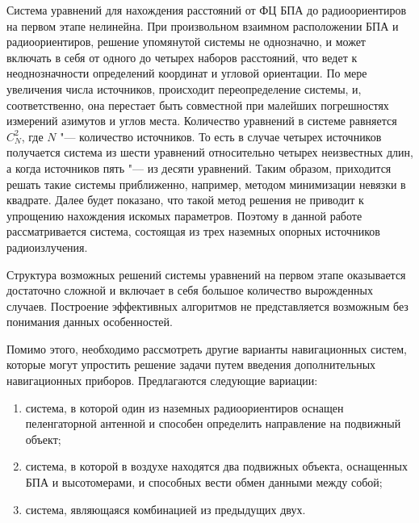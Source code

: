 \documentclass[../main.tex]{subfiles}
\begin{document}
Система уравнений для нахождения расстояний от ФЦ БПА до радиоориентиров на первом этапе нелинейна. При произвольном взаимном расположении БПА и радиоориентиров, решение упомянутой системы не однозначно, и может включать в себя от одного до четырех наборов расстояний, что ведет к неоднозначности определений координат и угловой ориентации. По мере увеличения числа источников, происходит переопределение системы, и, соответственно, она перестает быть совместной при малейших погрешностях измерений азимутов и углов места. Количество уравнений в системе равняется $C_N^2$, где $N$ "--- количество источников. То есть в случае четырех источников получается система из шести уравнений относительно четырех неизвестных длин, а когда источников пять "--- из десяти уравнений. Таким образом, приходится решать такие системы приближенно, например, методом минимизации невязки в квадрате. Далее будет показано, что такой метод решения не приводит к упрощению нахождения искомых параметров. Поэтому в данной работе рассматривается система, состоящая из трех наземных опорных источников радиоизлучения.

Структура возможных решений системы уравнений на первом этапе оказывается достаточно сложной и включает в себя большое количество вырожденных случаев. Построение эффективных алгоритмов не представляется возможным без понимания данных особенностей.

Помимо этого, необходимо рассмотреть другие варианты навигационных систем, которые могут упростить решение задачи путем введения дополнительных навигационных приборов. Предлагаются следующие вариации:
\begin{enumerate}
    \item система, в которой один из наземных радиоориентиров оснащен пеленгаторной антенной и способен определить направление на подвижный объект;
    \item система, в которой в воздухе находятся два подвижных объекта, оснащенных БПА и высотомерами, и способных вести обмен данными между собой;
    \item система, являющаяся комбинацией из предыдущих двух.
\end{enumerate}
\end{document}
